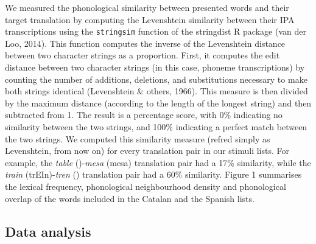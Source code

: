 \documentclass[
  english,
  man,floatsintext]{apa7}
\begin{document}
We measured the phonological similarity between presented words and their target translation by computing the Levenshtein similarity between their IPA transcriptions using the \texttt{stringsim} function of the stringdist R package (van der Loo, 2014). This function computes the inverse of the Levenshtein distance between two character strings as a proportion. First, it computes the edit distance between two character strings (in this case, phoneme transcriptions) by counting the number of additions, deletions, and substitutions necessary to make both strings identical (Levenshtein \& others, 1966). This measure is then divided by the maximum distance (according to the length of the longest string) and then subtracted from 1. The result is a percentage score, with 0\% indicating no similarity between the two strings, and 100\% indicating a perfect match between the two strings. We computed this similarity measure (refred simply as Levenshtein, from now on) for every translation pair in our stimuli lists. For example, the \emph{table} ()-\emph{mesa} (mesa) translation pair had a 17\% similarity, while the \emph{train} (trEIn)-\emph{tren} () translation pair had a 60\% similarity. Figure 1 summarises the lexical frequency, phonological neighbourhood density and phonological overlap of the words included in the Catalan and the Spanish lists.

\hypertarget{data-analysis}{%
\subsection{Data analysis}\label{data-analysis}}
\end{document}
